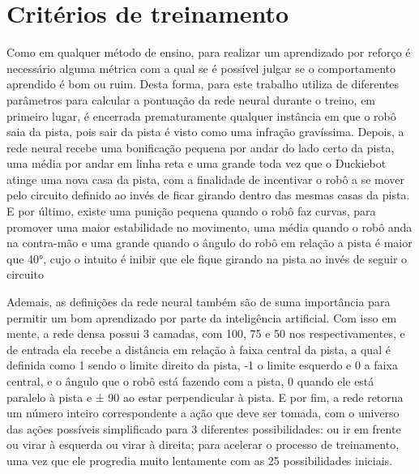 \section{Critérios de treinamento}
\label{sec:criterios_de_treinamto}

Como em qualquer método de ensino, para realizar um aprendizado por reforço é necessário alguma métrica com a qual se é possível julgar se o comportamento aprendido é bom ou ruim. Desta forma, para este trabalho utiliza de diferentes parâmetros para calcular a pontuação da rede neural durante o treino, em primeiro lugar, é encerrada prematuramente qualquer instância em que o robô saia da pista, pois sair da pista é visto como uma infração gravíssima. Depois, a rede neural recebe uma bonificação pequena por andar do lado certo da pista, uma média por andar em linha reta e uma grande toda vez que o Duckiebot atinge uma nova casa da pista, com a finalidade de incentivar o robô a se mover pelo circuito definido ao invés de ficar girando dentro das mesmas casas da pista. E por último, existe uma punição pequena quando o robô faz curvas, para promover uma maior estabilidade no movimento, uma média quando o robô anda na contra-mão e uma grande quando o ângulo do robô em relação a pista é maior que 40°, cujo o intuito é inibir que ele fique girando na pista ao invés de seguir o circuito
	
Ademais, as definições da rede neural também são de suma importância para permitir um bom aprendizado por parte da inteligência artificial. Com isso em mente, a rede densa possui 3 camadas, com 100, 75 e 50 nos respectivamentes, e de entrada ela recebe a distância em relação à faixa central da pista, a qual é definida como 1 sendo o limite direito da pista, -1 o limite esquerdo e 0 a faixa central, e o ângulo que o robô está fazendo com a pista, 0 quando ele está paralelo à pista e ± 90 ao estar perpendicular à pista. E por fim, a rede retorna um número inteiro correspondente a ação que deve ser tomada, com o universo das ações possíveis simplificado para 3 diferentes possibilidades: ou ir em frente ou virar à esquerda ou virar à direita; para acelerar o processo de treinamento, uma vez que ele progredia muito lentamente com as 25 possibilidades iniciais.
